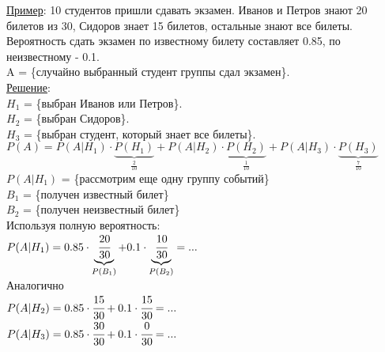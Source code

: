 \underline{Пример}: 10 студентов пришли сдавать экзамен. Иванов и Петров знают 20 билетов из 30, Сидоров знает 15 билетов, остальные знают все билеты. \\
Вероятность сдать экзамен по известному билету составляет 0.85, по неизвестному - 0.1. \\
A = \{случайно выбранный студент группы сдал экзамен\}. \\
\underline{Решение}: \\
$H_1$ = \{выбран Иванов или Петров\}. \\
$H_2$ = \{выбран Сидоров\}. \\
$H_3$ = \{выбран студент, который знает все билеты\}. \\
$P(A) = P(A|H_1) \cdot \underbrace{P(H_1)}_{\tfrac{2}{10}} + P(A|H_2) \cdot \underbrace{P(H_2)}_{\tfrac{1}{10}} + P(A|H_3) \cdot \underbrace{P(H_3)}_{\tfrac{7}{10}}$ \\

$P(A|H_1)$ = \{рассмотрим еще одну группу событий\} \\
$B_1$ = \{получен известный билет\} \\
$B_2$ = \{получен неизвестный билет\} \\
Используя полную вероятность: \\
$P(A|H_1) = 0.85 \cdot \underbrace{\cfrac{20}{30}}_{P(B_1)} + 0.1 \cdot \underbrace{\cfrac{10}{30}}_{P(B_2)} = ...$ \\
Аналогично \\
$P(A|H_2) = 0.85 \cdot \cfrac{15}{30} + 0.1 \cdot \cfrac{15}{30} = ...$ \\
$P(A|H_3) = 0.85 \cdot \cfrac{30}{30} + 0.1 \cdot \cfrac{0}{30} = ...$ \\


























